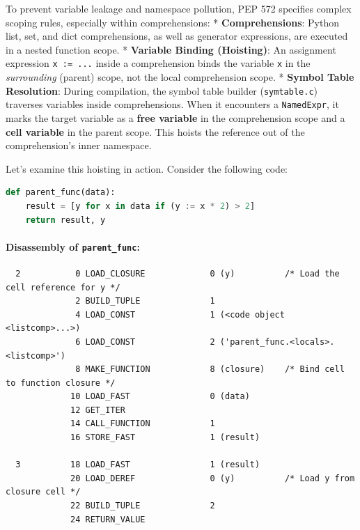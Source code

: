 To prevent variable leakage and namespace pollution, PEP 572 specifies
complex scoping rules, especially within comprehensions: *
\textbf{Comprehensions}: Python list, set, and dict comprehensions, as
well as generator expressions, are executed in a nested function scope.
* \textbf{Variable Binding (Hoisting)}: An assignment expression
\passthrough{\lstinline!x := ...!} inside a comprehension binds the
variable \passthrough{\lstinline!x!} in the \emph{surrounding} (parent)
scope, not the local comprehension scope. * \textbf{Symbol Table
Resolution}: During compilation, the symbol table builder
(\passthrough{\lstinline!symtable.c!}) traverses variables inside
comprehensions. When it encounters a
\passthrough{\lstinline!NamedExpr!}, it marks the target variable as a
\textbf{free variable} in the comprehension scope and a \textbf{cell
variable} in the parent scope. This hoists the reference out of the
comprehension's inner namespace.

Let's examine this hoisting in action. Consider the following code:

\begin{lstlisting}[language=Python]
def parent_func(data):
    result = [y for x in data if (y := x * 2) > 2]
    return result, y
\end{lstlisting}

\hypertarget{disassembly-of-parent_func}{%
\paragraph{\texorpdfstring{Disassembly of
\texttt{parent\_func}:}{Disassembly of parent\_func:}}\label{disassembly-of-parent_func}}

\begin{lstlisting}
  2           0 LOAD_CLOSURE             0 (y)          /* Load the cell reference for y */
              2 BUILD_TUPLE              1
              4 LOAD_CONST               1 (<code object <listcomp>...>)
              6 LOAD_CONST               2 ('parent_func.<locals>.<listcomp>')
              8 MAKE_FUNCTION            8 (closure)    /* Bind cell to function closure */
             10 LOAD_FAST                0 (data)
             12 GET_ITER
             14 CALL_FUNCTION            1
             16 STORE_FAST               1 (result)

  3          18 LOAD_FAST                1 (result)
             20 LOAD_DEREF               0 (y)          /* Load y from closure cell */
             22 BUILD_TUPLE              2
             24 RETURN_VALUE
\end{lstlisting}

